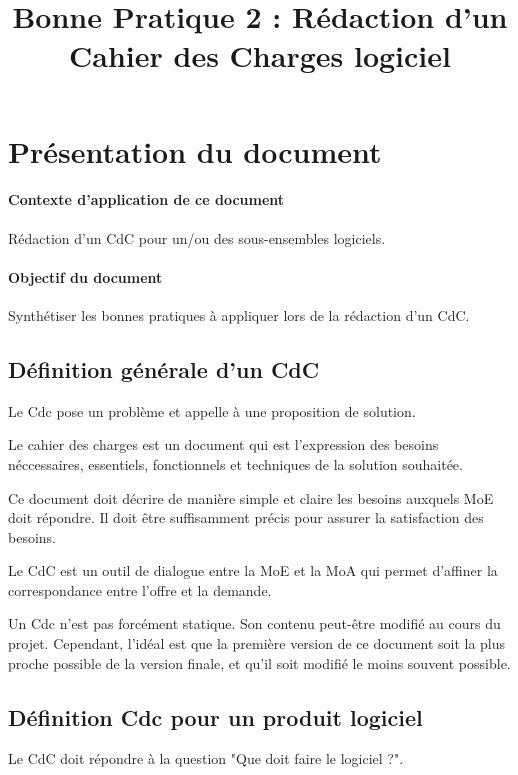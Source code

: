 \documentclass[a4paper]{article}
\begin{document}
\title{Bonne Pratique 2 : Rédaction d'un Cahier des Charges logiciel}
\maketitle

\section{Présentation du document}

\paragraph{Contexte d'application de ce document} Rédaction d'un CdC pour un/ou des sous-ensembles logiciels.

\paragraph{Objectif du document} Synthétiser les bonnes pratiques à appliquer lors de la rédaction d'un CdC.

\subsection{Définition générale d'un CdC}

Le Cdc pose un problème et appelle à une proposition de solution.

Le cahier des charges est un document qui est l'expression des besoins néccessaires, essentiels, fonctionnels et techniques de la solution souhaitée.

Ce document doit décrire de manière simple et claire les besoins auxquels MoE doit répondre. Il doit être suffisamment précis pour assurer la satisfaction des besoins.

Le CdC est un outil de dialogue entre la MoE et la MoA qui permet d'affiner la correspondance entre l'offre et la demande.

Un Cdc n'est pas forcément statique. Son contenu peut-être modifié au cours du projet. Cependant, l'idéal est que la première version de ce document soit la plus proche possible de la version finale, et qu'il soit modifié le moins souvent possible.


\subsection{Définition Cdc pour un produit logiciel}

Le CdC doit répondre à la question "Que doit faire le logiciel ?".
\end{document}
